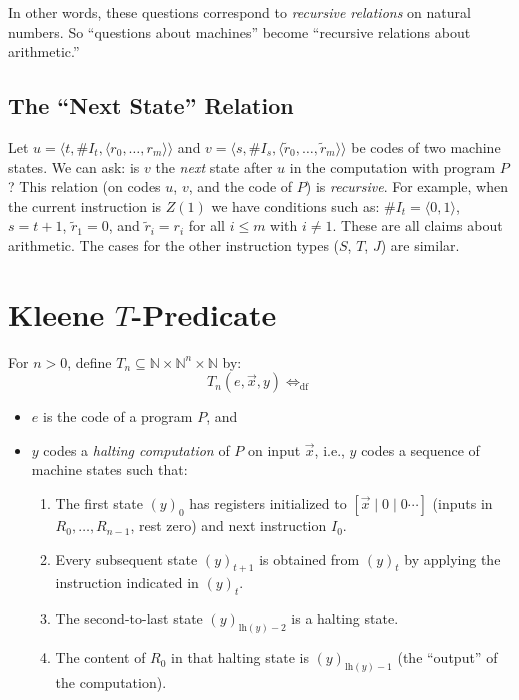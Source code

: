 \documentclass[11pt]{article}
\begin{document}
In other words, these questions correspond to \emph{recursive relations} on natural numbers. So ``questions about machines'' become ``recursive relations about arithmetic.''

\subsection{The ``Next State'' Relation}

Let $u = \langle t, \#I_t, \langle r_0, \dots, r_m \rangle \rangle$ and $v = \langle s, \#I_s, \langle \widetilde{r}_0, \dots, \widetilde{r}_m \rangle \rangle$ be codes of two machine states. We can ask: is $v$ the \emph{next} state after $u$ in the computation with program $P$? This relation (on codes $u$, $v$, and the code of $P$) is \emph{recursive}. For example, when the current instruction is $Z(1)$ we have conditions such as: $\#I_t = \langle 0, 1 \rangle$, $s = t+1$, $\widetilde{r}_1 = 0$, and $\widetilde{r}_i = r_i$ for all $i \le m$ with $i \neq 1$. These are all claims about arithmetic. The cases for the other instruction types ($S$, $T$, $J$) are similar.

\section{Kleene $T$-Predicate}

For $n > 0$, define $T_n \subseteq \mathbb{N} \times \mathbb{N}^n \times \mathbb{N}$ by:
\[
    T_n(e, \vec{x}, y) \iff_{\mathrm{df}}
\]
\begin{itemize}[leftmargin=1.6em]
    \item $e$ is the code of a program $P$, and
    \item $y$ codes a \emph{halting computation} of $P$ on input $\vec{x}$, i.e., $y$ codes a sequence of machine states such that:
    \begin{enumerate}[label=(\arabic*), leftmargin=1.8em]
        \item The first state $(y)_0$ has registers initialized to $[\vec{x} \mid 0 \mid 0 \cdots]$ (inputs in $R_0, \dots, R_{n-1}$, rest zero) and next instruction $I_0$.
        \item Every subsequent state $(y)_{t+1}$ is obtained from $(y)_t$ by applying the instruction indicated in $(y)_t$.
        \item The second-to-last state $(y)_{\mathrm{lh}(y)-2}$ is a halting state.
        \item The content of $R_0$ in that halting state is $(y)_{\mathrm{lh}(y)-1}$ (the ``output'' of the computation).
    \end{enumerate}
\end{itemize}
\end{document}
